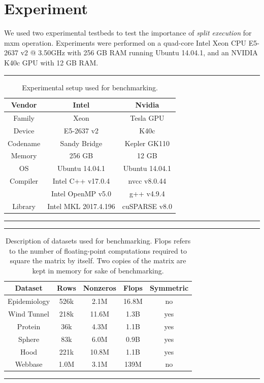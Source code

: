 \section{Experiment}
\label{Sec:experiment}

We used two experimental testbeds to test the importance of \emph{split execution} for {\sf mxm} operation. Experiments were performed on a quad-core Intel Xeon CPU E5-2637 v2 @ 3.50GHz with 256 GB RAM running Ubuntu 14.04.1, and an NVIDIA K40c GPU with 12 GB RAM.

\begin{table}[htb]
	\hrule
	\caption{Experimental setup used for benchmarking.}
	\label{Tab:testbed}
	\begin{center}
	\begin{tabular}{|c|c|c|} \hline
		Vendor & Intel & Nvidia \\ \hline
		Family & Xeon & Tesla GPU \\
		Device & E5-2637 v2 & K40c \\
		Codename & Sandy Bridge & Kepler GK110 \\
		Memory & 256 GB & 12 GB \\
		OS & Ubuntu 14.04.1 & Ubuntu 14.04.1 \\
		Compiler & Intel C++ v17.0.4 & nvcc v8.0.44 \\
		 & Intel OpenMP v5.0 & g++ v4.9.4 \\
		Library & Intel MKL 2017.4.196 & cuSPARSE v8.0 \\ \hline
	\end{tabular}
	\end{center}
	\hrule
\end{table}

\begin{table}[htb]
	\hrule
	\caption{Description of datasets used for benchmarking. Flops refers to the number of floating-point computations required to square the matrix by itself. Two copies of the matrix are kept in memory for sake of benchmarking.}
	\label{Tab:testbed}
	\begin{center}
		\begin{tabular}{|c|c|c|c|c|} \hline
			Dataset & Rows & Nonzeros & Flops & Symmetric\\ \hline
			Epidemiology & 526k & 2.1M & 16.8M & no \\
			Wind Tunnel & 218k & 11.6M & 1.3B & yes \\
			Protein & 36k & 4.3M & 1.1B & yes\\
			Sphere & 83k & 6.0M & 0.9B & yes\\
			Hood & 221k & 10.8M & 1.1B & yes \\
			Webbase & 1.0M & 3.1M & 139M & no \\ \hline
		\end{tabular}
	\end{center}
	\hrule
\end{table}

